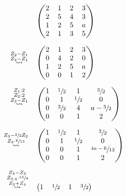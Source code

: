 \documentclass[main.tex]{subfiles}
\begin{document}
\begin{gather*}
    \arraycolsep=0.6em
    \begin{array}{ r l }
        & \begin{pmatrix}
            2 & 1 & 2 & 3 \\
            2 & 5 & 4 & 3 \\
            1 & 2 & 5 & a \\
            2 & 1 & 3 & 5
        \end{pmatrix}\\[10mm]
    \overset{\substack{Z_2 - Z_1 \\ Z_4 - Z_1}}{\rightsquigarrow} &
        \begin{pmatrix}
            2 & 1 & 2 & 3 \\
            0 & 4 & 2 & 0 \\
            1 & 2 & 5 & a \\
            0 & 0 & 1 & 2
        \end{pmatrix}\\[10mm]
    \overset{\substack{Z_1 : 2 \\ Z_2 : 2 \\ Z_3 - Z_1}}{\rightsquigarrow} &
        \begin{pmatrix}
            1 & \sfrac{1}{2} & 1 & \sfrac{3}{2} \\
            0 & 1 & \sfrac{1}{2} & 0 \\
            0 & \sfrac{3}{2} & 4 & a - \sfrac{3}{2} \\
            0 & 0 & 1 & 2
        \end{pmatrix}\\[10mm]
    \overset{\substack{Z_3 - \sfrac{3}{2} Z_2\\Z_3\cdot \sfrac{4}{13}}}{\rightsquigarrow} &
        \begin{pmatrix}
            1 & \sfrac{1}{2} & 1 & \sfrac{3}{2} \\
            0 & 1 & \sfrac{1}{2} & 0 \\
            0 & 0 & 1 & \sfrac{4a - 6}{13} \\
            0 & 0 & 1 & 2
        \end{pmatrix}\\[10mm]
    \overset{\substack{Z_4 - Z_3\\Z_{3,4}\cdot \sfrac{13}{4}\\Z_3 + Z_4}}{\rightsquigarrow} &
        \begin{pmatrix}
            1 & \sfrac{1}{2} & 1 & \sfrac{3}{2} \\

\end{pmatrix}
\end{array}
\end{gather*}
\end{document}
